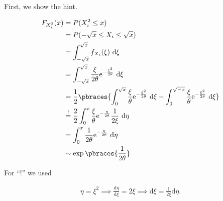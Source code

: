 \begin{solution}

First, we show the hint.

\begin{align*}
    F_{X_i^2}(x)
    & =
    P(X_i^2 \leq x) \\
    & =
    P(-\sqrt x \leq X_i \leq \sqrt x) \\
    & =
    \int_{-\sqrt x}^{\sqrt x}
        f_{X_i}(\xi)
        ~ \mathrm d \xi \\
    & =
    \int_{-\sqrt x}^{\sqrt x}
        \frac{\xi}{2 \theta}
        \mathrm e^{-\frac{\xi^2}{2 \theta}}
        ~ \mathrm d \xi \\
    & =
    \frac{1}{2}
    \pbraces
    {
        \int_0^{\sqrt x}
            \frac{\xi}{\theta}
            \mathrm e^{-\frac{\xi^2}{2 \theta}}
            ~ \mathrm d \xi
        -
        \int_0^{\sqrt{-x}}
            \frac{\xi}{\theta}
            \mathrm e^{-\frac{\xi^2}{2 \theta}}
            ~ \mathrm d \xi
    } \\
    & \stackrel{!}{=}
    \frac{2}{2}
    \int_0^x
        \frac{\xi}{\theta}
        \mathrm e^{-\frac{\eta}{2 \theta}}
        \frac{1}{2 \xi}
        ~ \mathrm d \eta \\
    & =
    \int_0^x
        \frac{1}{2 \theta}
        \mathrm e^{-\frac{\eta}{2 \theta}}
        ~ \mathrm d \eta \\
    & \sim
    \exp \pbraces{\frac{1}{2 \theta}}
\end{align*}

For \enquote ! we used

\begin{align*}
    \eta = \xi^2
    \implies
    \frac{\mathrm d \eta}{\mathrm d \xi} = 2 \xi
    \implies
    \mathrm d \xi = \frac{1}{2 \xi} \mathrm d \eta.
\end{align*}


\end{solution}
